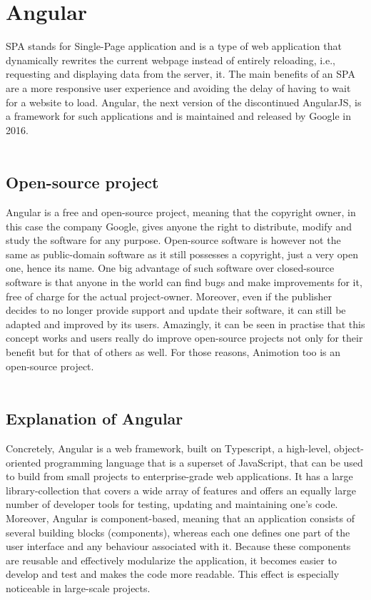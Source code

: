 \section{Angular}
SPA stands for Single-Page application and is a type of web application that dynamically rewrites the 
current webpage instead of entirely reloading, i.e., requesting and displaying data from the server, it. 
The main benefits of an SPA are a more responsive user experience and avoiding the delay of having to wait 
for a website to load. Angular, the next version of the discontinued AngularJS, is a framework for such 
applications and is maintained and released by Google in 2016. \cite{RoadToReact}
\\
\\
\subsection{Open-source project}
Angular is a free and open-source project, meaning that the copyright owner, in this case the company Google,
gives anyone the right to distribute, modify and study the software for any purpose. Open-source software is 
however not the same as public-domain software as it still possesses a copyright, just a very open one, hence its name. 
One big advantage of such software over closed-source software is that anyone in the world can find bugs and make 
improvements for it, free of charge for the actual project-owner. Moreover, even if the publisher decides to no longer 
provide support and update their software, it can still be adapted and improved by its users. Amazingly, it can be seen 
in practise that this concept works and users really do improve open-source projects not only for their benefit but for 
that of others as well. For those reasons, Animotion too is an open-source project.\cite{Opensource}
\\
\\
\subsection{Explanation of Angular}
Concretely, Angular is a web framework, built on Typescript, a high-level, object-oriented programming language that is 
a superset of JavaScript, that can be used to build from small projects to enterprise-grade web applications. It has a 
large library-collection that covers a wide array of features and offers an equally large number of developer tools for 
testing, updating and maintaining one's code. Moreover, Angular is component-based, meaning that an application consists 
of several building blocks (components), whereas each one defines one part of the user interface and any behaviour associated 
with it. Because these components are reusable and effectively modularize the application, it becomes easier to develop and 
test and makes the code more readable. This effect is especially noticeable in large-scale projects. \cite{AngularDescription}
\\
\\
